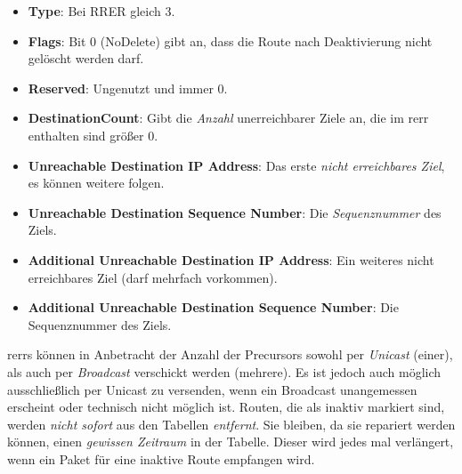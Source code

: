 \begin{itemize}
\item \textbf{Type}: Bei RRER gleich 3.
\item \textbf{Flags}: Bit 0 (NoDelete) gibt an, dass die Route nach Deaktivierung nicht gelöscht werden darf.
\item \textbf{Reserved}: Ungenutzt und immer 0.
\item \textbf{DestinationCount}: Gibt die \textit{Anzahl} unerreichbarer Ziele an, die im \gls{rerr} enthalten sind größer 0. 
\item \textbf{Unreachable Destination IP Address}: Das erste \textit{nicht erreichbares Ziel}, es können weitere folgen.
\item \textbf{Unreachable Destination Sequence Number}: Die \textit{Sequenznummer} des Ziels.
\item \textbf{Additional Unreachable Destination IP Address}: Ein weiteres nicht erreichbares Ziel (darf mehrfach vorkommen).
\item \textbf{Additional Unreachable Destination Sequence Number}: Die Sequenznummer des Ziels.
\end{itemize}

\glspl{rerr} können in Anbetracht der Anzahl der Precursors sowohl per \textit{Unicast} (einer), als auch per \textit{Broadcast} verschickt werden (mehrere). Es ist jedoch auch möglich ausschließlich per Unicast zu versenden, wenn ein Broadcast unangemessen erscheint oder technisch nicht möglich ist. Routen, die als inaktiv markiert sind, werden \textit{nicht sofort} aus den Tabellen \textit{entfernt}. Sie bleiben, da sie \ggf repariert werden können, einen \textit{gewissen Zeitraum} in der Tabelle. Dieser wird jedes mal verlängert, wenn ein Paket für eine inaktive Route empfangen wird.


